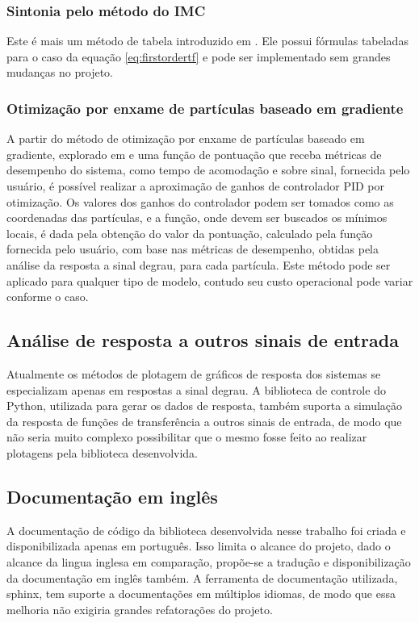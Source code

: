 \subsubsection{Sintonia pelo método do IMC}
Este é mais um método de tabela introduzido em \cite{apostpidsint}.
Ele possui fórmulas tabeladas para o caso da equação \eqref{eq:firstordertf} e pode ser implementado sem grandes
mudanças no projeto.

\subsubsection{Otimização por enxame de partículas baseado em gradiente}
A partir do método de otimização por enxame de partículas baseado em gradiente, explorado em \cite{gpsopt} e uma função
de pontuação que receba métricas de desempenho do sistema, como tempo de acomodação e sobre sinal, fornecida pelo usuário,
é possível realizar a aproximação de ganhos de controlador PID por otimização.
Os valores dos ganhos do controlador podem ser tomados como as coordenadas das partículas, e a função, onde devem ser
buscados os mínimos locais, é dada pela obtenção do valor da pontuação, calculado pela função fornecida pelo
usuário, com base nas métricas de desempenho, obtidas pela análise da resposta a sinal degrau, para cada partícula.
Este método pode ser aplicado para qualquer tipo de modelo, contudo seu custo operacional pode variar conforme o caso.

\subsection{Análise de resposta a outros sinais de entrada}
Atualmente os métodos de plotagem de gráficos de resposta dos sistemas se especializam apenas em respostas a sinal
degrau.
A biblioteca de controle do Python, utilizada para gerar os dados de resposta, também suporta a simulação da resposta
de funções de transferência a outros sinais de entrada, de modo que não seria muito complexo possibilitar que o mesmo
fosse feito ao realizar plotagens pela biblioteca desenvolvida.

\subsection{Documentação em inglês}
A documentação de código da biblioteca desenvolvida nesse trabalho foi criada e disponibilizada apenas em português.
Isso limita o alcance do projeto, dado o alcance da lingua inglesa em comparação, propõe-se a tradução e
disponibilização da documentação em inglês também.
A ferramenta de documentação utilizada, sphinx, tem suporte a documentações em múltiplos idiomas, de modo que essa
melhoria não exigiria grandes refatorações do projeto.

